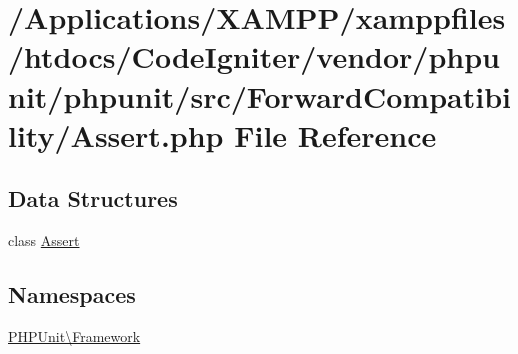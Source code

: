 \hypertarget{phpunit_2phpunit_2src_2_forward_compatibility_2_assert_8php}{}\section{/\+Applications/\+X\+A\+M\+P\+P/xamppfiles/htdocs/\+Code\+Igniter/vendor/phpunit/phpunit/src/\+Forward\+Compatibility/\+Assert.php File Reference}
\label{phpunit_2phpunit_2src_2_forward_compatibility_2_assert_8php}
\subsection*{Data Structures}
\begin{DoxyCompactItemize}
\item 
class \mbox{\hyperlink{class_p_h_p_unit_1_1_framework_1_1_assert}{Assert}}
\end{DoxyCompactItemize}
\subsection*{Namespaces}
\begin{DoxyCompactItemize}
\item 
 \mbox{\hyperlink{namespace_p_h_p_unit_1_1_framework}{P\+H\+P\+Unit\textbackslash{}\+Framework}}
\end{DoxyCompactItemize}
